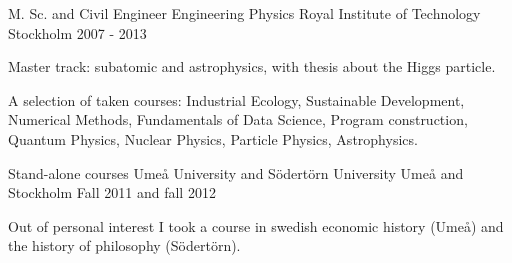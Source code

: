 


\begin{cventries}

\cventry
{M. Sc. and Civil Engineer Engineering Physics} %
{Royal Institute of Technology} %
{Stockholm} %
{2007 - 2013} %
{ %
\begin{cvitems}
\item {Master track: subatomic and astrophysics, with thesis about the Higgs particle.}
\item {A selection of taken courses: Industrial Ecology, Sustainable Development, Numerical Methods, Fundamentals of Data Science, Program construction, Quantum Physics, Nuclear Physics, Particle Physics, Astrophysics.
}
\end{cvitems}
}

\cventry
{Stand-alone courses} %
{Ume{\aa} University and S{\"o}dert{\"o}rn University} %
{Ume{\aa} and Stockholm} %
{Fall 2011 and fall 2012} %
{ %
\begin{cvitems}
\item {Out of personal interest I took a course in swedish economic history (Ume{\aa}) and the history of philosophy (S{\"o}dert{\"o}rn).
}
\end{cvitems}
}

\end{cventries}